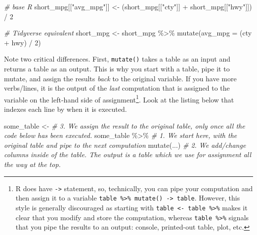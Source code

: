 \documentclass[
]{book}
\newenvironment{Shaded}{\begin{snugshade}}{\end{snugshade}}
\newcommand{\AttributeTok}[1]{\textcolor[rgb]{0.77,0.63,0.00}{#1}}
\newcommand{\CommentTok}[1]{\textcolor[rgb]{0.56,0.35,0.01}{\textit{#1}}}
\newcommand{\DecValTok}[1]{\textcolor[rgb]{0.00,0.00,0.81}{#1}}
\newcommand{\FunctionTok}[1]{\textcolor[rgb]{0.00,0.00,0.00}{#1}}
\newcommand{\NormalTok}[1]{#1}
\newcommand{\OtherTok}[1]{\textcolor[rgb]{0.56,0.35,0.01}{#1}}
\newcommand{\SpecialCharTok}[1]{\textcolor[rgb]{0.00,0.00,0.00}{#1}}
\newcommand{\StringTok}[1]{\textcolor[rgb]{0.31,0.60,0.02}{#1}}
\begin{document}
\begin{Shaded}
\begin{Highlighting}[]
\CommentTok{\# base R}
\NormalTok{short\_mpg[[}\StringTok{"avg\_mpg"}\NormalTok{]] }\OtherTok{\textless{}{-}}\NormalTok{ (short\_mpg[[}\StringTok{"cty"}\NormalTok{]] }\SpecialCharTok{+}\NormalTok{ short\_mpg[[}\StringTok{"hwy"}\NormalTok{]]) }\SpecialCharTok{/} \DecValTok{2}

\CommentTok{\# Tidyverse equivalent}
\NormalTok{short\_mpg }\OtherTok{\textless{}{-}} 
\NormalTok{  short\_mpg }\SpecialCharTok{\%\textgreater{}\%}
  \FunctionTok{mutate}\NormalTok{(}\AttributeTok{avg\_mpg =}\NormalTok{ (cty }\SpecialCharTok{+}\NormalTok{ hwy) }\SpecialCharTok{/} \DecValTok{2}\NormalTok{)}
\end{Highlighting}
\end{Shaded}

Note two critical differences. First, \texttt{mutate()} takes a table as an input and returns a table as an output. This is why you start with a table, pipe it to mutate, and assign the results \emph{back} to the original variable. If you have more verbs/lines, it is the output of the \emph{last} computation that is assigned to the variable on the left-hand side of assignment\footnote{R does have \texttt{-\textgreater{}} statement, so, technically, you can pipe your computation and then assign it to a variable \texttt{table\ \%\textgreater{}\%\ mutate()\ -\textgreater{}\ table}. However, this style is generally discouraged as starting with \texttt{table\ \textless{}-\ table\ \%\textgreater{}\%} makes it clear that you modify and store the computation, whereas \texttt{table\ \%\textgreater{}\%} signals that you pipe the results to an output: console, printed-out table, plot, etc.}. Look at the listing below that indexes each line by when it is executed.

\begin{Shaded}
\begin{Highlighting}[]
\NormalTok{some\_table }\OtherTok{\textless{}{-}}    \CommentTok{\# 3. We assign the result to the original table, only once all the code below has been executed.}
\NormalTok{  some\_table }\SpecialCharTok{\%\textgreater{}\%} \CommentTok{\# 1. We start here, with the original table and pipe to the next computation}
  \FunctionTok{mutate}\NormalTok{(...)    }\CommentTok{\# 2. We add/change columns inside of the table. The output is a table which we use for assignment all the way at the top.}
\end{Highlighting}
\end{Shaded}
\end{document}
